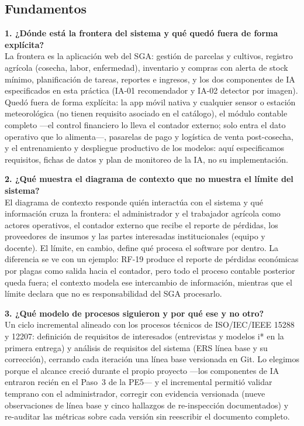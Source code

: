 \subsection*{Fundamentos}

\noindent\textbf{1. ¿Dónde está la frontera del sistema y qué quedó fuera de forma explícita?}\\
La frontera es la aplicación web del SGA: gestión de parcelas y cultivos, registro agrícola (cosecha, labor, enfermedad), inventario y compras con alerta de stock mínimo, planificación de tareas, reportes e ingresos, y los dos componentes de IA especificados en esta práctica (IA-01 recomendador y IA-02 detector por imagen). Quedó fuera de forma explícita: la app móvil nativa y cualquier sensor o estación meteorológica (no tienen requisito asociado en el catálogo), el módulo contable completo ---el control financiero lo lleva el contador externo; solo entra el dato operativo que lo alimenta---, pasarelas de pago y logística de venta post-cosecha, y el entrenamiento y despliegue productivo de los modelos: aquí especificamos requisitos, fichas de datos y plan de monitoreo de la IA, no su implementación.

\medskip
\noindent\textbf{2. ¿Qué muestra el diagrama de contexto que no muestra el límite del sistema?}\\
El diagrama de contexto responde quién interactúa con el sistema y qué información cruza la frontera: el administrador y el trabajador agrícola como actores operativos, el contador externo que recibe el reporte de pérdidas, los proveedores de insumos y las partes interesadas institucionales (equipo y docente). El límite, en cambio, define qué procesa el software por dentro. La diferencia se ve con un ejemplo: RF-19 produce el reporte de pérdidas económicas por plagas como salida hacia el contador, pero todo el proceso contable posterior queda fuera; el contexto modela ese intercambio de información, mientras que el límite declara que no es responsabilidad del SGA procesarlo.

\medskip
\noindent\textbf{3. ¿Qué modelo de procesos siguieron y por qué ese y no otro?}\\
Un ciclo incremental alineado con los procesos técnicos de ISO/IEC/IEEE 15288 y 12207: definición de requisitos de interesados (entrevistas y modelos i* en la primera entrega) y análisis de requisitos del sistema (ERS línea base y su corrección), cerrando cada iteración una línea base versionada en Git. Lo elegimos porque el alcance creció durante el propio proyecto ---los componentes de IA entraron recién en el Paso~3 de la PE5--- y el incremental permitió validar temprano con el administrador, corregir con evidencia versionada (nueve observaciones de línea base y cinco hallazgos de re-inspección documentados) y re-auditar las métricas sobre cada versión sin reescribir el documento completo.

